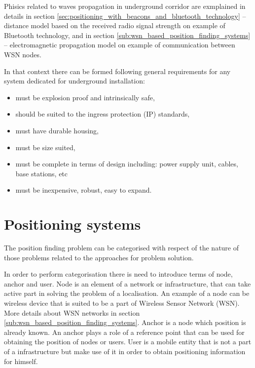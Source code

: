 \documentclass[../main.tex]{subfiles}
\begin{document}
Phisics related to waves propagation in underground corridor are exmplained in details in section \ref{sec:positioning_with_beacons_and_bluetooth_technology}  -- distance model based on the received radio signal strength on example of Bluetooth technology, and in section \ref{sub:wsn_based_position_finding_systems} -- electromagnetic propagation model on example of communication between WSN nodes.

In that context there can be formed following general requirements for any system dedicated for underground installation\cite{Book_wireless_in_mines}:
\begin{itemize}
	\item must be explosion proof and intrinsically safe,
	\item should be suited to the ingress protection (IP) standards,
	\item must have durable housing,
	\item must be size suited,
	\item must be complete in terms of design including: power supply unit, cables, base stations, etc
	\item must be inexpensive, robust, easy to expand.
\end{itemize}

\section{Positioning systems}
\label{sec:positioning_systems}

The position finding problem can be categorised with respect of the nature of those problems related to the approaches for problem solution.

In order to perform categorisation there is need to introduce terms of node, anchor and user. Node is an element of a network or infrastructure, that can take active part in solving the problem of a localisation. An example of a node can be wireless device that is suited to be a part of Wireless Sensor Network (WSN). More details about WSN networks in section \ref{sub:wsn_based_position_finding_systems}. Anchor is a node which position is already known. An anchor plays a role of a reference point that can be used for obtaining the position of nodes or users. User is a mobile entity that is not a part of a infrastructure but make use of it in order to obtain positioning information for himself.
\end{document}
